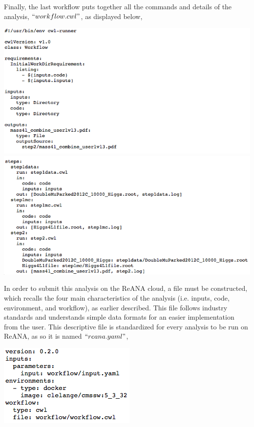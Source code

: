\documentclass[letter]{article}
\newcommand\tab[1][1cm]{\hspace*{#1}}
\begin{document}
Finally, the last workflow puts together all the commands and details of the analysis, $``workflow.cwl"$, as displayed below,
\begin{center}
\includegraphics[scale=0.5]{work1}
\includegraphics[scale=0.5]{work2}
\end{center}
\tab In order to submit this analysis on the ReANA cloud, a file must be constructed, which recalls the four main characteristics of the analysis (i.e. inputs, code, environment, and workflow), as earlier described. This file follows industry standards and understands simple data formats for an easier implementation from the user. This descriptive file is standardized for every analysis to be run on ReANA, as so it is named $``reana.yaml"$,
\begin{center}
\includegraphics[scale=0.5]{reana}
\end{center}
\end{document}
